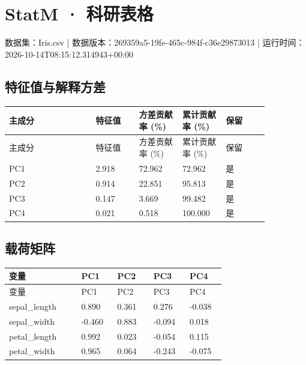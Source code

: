 \documentclass[UTF8]{ctexart}
\begin{document}
\section*{StatM · 科研表格}
数据集：Iris.csv | 数据版本：269359a5-19fe-465c-984f-c36e29873013 | 运行时间：2026-10-14T08:15:12.314943+00:00\par
{}
\subsection*{特征值与解释方差}
\small
\setlength{\tabcolsep}{2pt}
\begin{longtable}{p{0.2867\linewidth}p{0.1433\linewidth}p{0.1433\linewidth}p{0.1433\linewidth}p{0.1433\linewidth}}
\toprule
主成分 & 特征值 & 方差贡献率 (\%) & 累计贡献率 (\%) & 保留 \\
\midrule
\endfirsthead
\toprule
主成分 & 特征值 & 方差贡献率 (\%) & 累计贡献率 (\%) & 保留 \\
\midrule
\endhead
PC1 & 2.918 & 72.962 & 72.962 & 是 \\
PC2 & 0.914 & 22.851 & 95.813 & 是 \\
PC3 & 0.147 & 3.669 & 99.482 & 是 \\
PC4 & 0.021 & 0.518 & 100.000 & 是 \\
\bottomrule
\end{longtable}
\subsection*{载荷矩阵}
\small
\setlength{\tabcolsep}{2pt}
\begin{longtable}{p{0.2867\linewidth}p{0.1433\linewidth}p{0.1433\linewidth}p{0.1433\linewidth}p{0.1433\linewidth}}
\toprule
变量 & PC1 & PC2 & PC3 & PC4 \\
\midrule
\endfirsthead
\toprule
变量 & PC1 & PC2 & PC3 & PC4 \\
\midrule
\endhead
sepal\_length & 0.890 & 0.361 & 0.276 & -0.038 \\
sepal\_width & -0.460 & 0.883 & -0.094 & 0.018 \\
petal\_length & 0.992 & 0.023 & -0.054 & 0.115 \\
petal\_width & 0.965 & 0.064 & -0.243 & -0.075 \\
\bottomrule
\end{longtable}
\end{document}
